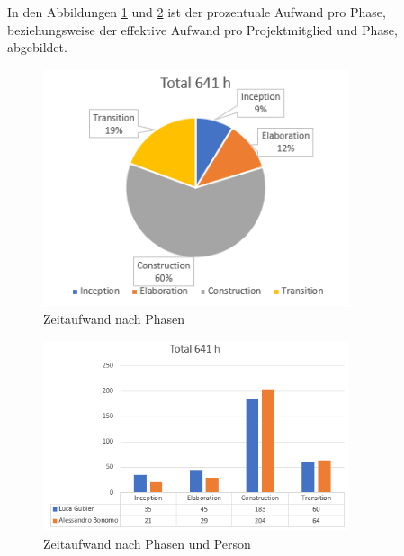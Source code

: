 In den Abbildungen \ref{time_per_phase} und \ref{time_per_phase_and_person} ist der prozentuale Aufwand pro Phase, beziehungsweise der effektive Aufwand pro Projektmitglied und Phase, abgebildet.

	\begin{figure}[H]
\begin{center}

		\includegraphics[width=0.8\textwidth, height=\textheight, keepaspectratio]{images/Zeitauswertung/Prozentualer_Aufwand_Phasen.png}
		\caption{Zeitaufwand nach Phasen}
		\label{time_per_phase}
	\end{center}		
\end{figure}

	\begin{figure}[H]
		\begin{center}
\includegraphics[width=0.8\textwidth, height=\textheight, keepaspectratio]{images/Zeitauswertung/Prozentualer_Aufwand_Phasen_Effektiv.png}
		\caption{Zeitaufwand nach Phasen und Person}
		\label{time_per_phase_and_person}
		\end{center}		
\end{figure}


